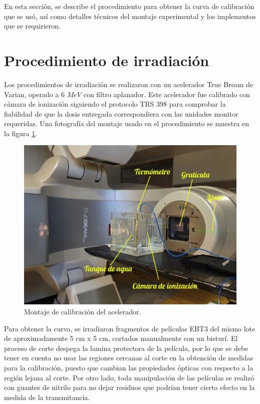 En esta sección, se describe el procedimiento para obtener la curva de calibración que se usó, así como detalles técnicos del montaje experimental y los implementos que se requirieron. 
\section{Procedimiento de irradiación}
Los procedimientos de irradiación se realizaron con un acelerador True Bream de  Varian, operado a 6 $ MeV$ con filtro aplanador. Este acelerador fue calibrado con cámara de ionización siguiendo el protocolo TRS 398 para comprobar la fiabilidad de que la dosis entregada correspondiera con las unidades monitor requeridas. Una fotografía del montaje usado en el procedimiento se muestra en la figura \ref{fig:fotoMontaje}.\\

\begin{figure}
	\centering
	\includegraphics[width=0.7\linewidth]{images/TRS398Editado2.jpg}
	\caption{Montaje de calibración del acelerador.}
	\label{fig:fotoMontaje}
\end{figure}
Para obtener la curva, se irradiaron fragmentos de películas EBT3 del mismo lote de aproximadamente 5 cm x 5 cm, cortados manualmente con un bisturí. El proceso de corte despega la lamina protectora de la película, por lo que se debe tener en cuenta no usar las regiones cercanas al corte en la obtención de medidas para la calibración, puesto que cambian las propiedades ópticas con respecto a la región lejana al corte. Por otro lado, toda manipulación de las películas se realizó con guantes de nitrilo para no dejar residuos que podrían tener cierto efecto en la medida de la transmitancia. \\


